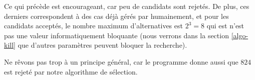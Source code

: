 Ce qui précède est encourageant, car peu de candidats sont rejetés. De plus, ces derniers correspondent à des cas déjà gérés par humainement, et pour les candidats acceptés, le nombre maximum d'alternatives est $2^3 = 8$ qui est n'est pas une valeur informatiquement bloquante (nous verrons dans la section \ref{algo-kill} que d'autres paramètres peuvent bloquer la recherche).



\begin{remark}
	Ne rêvons pas trop à un principe général, car le programme donne aussi que $824$ est rejeté par notre algorithme de sélection.
\end{remark}